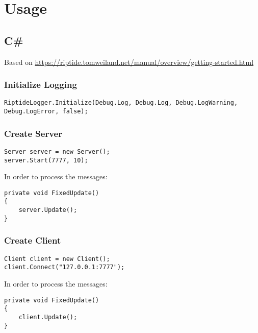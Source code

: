 \renewcommand{\namespace}{\nsHighLevel}

\chapter{Usage}

\section{C\#}

Based on \url{https://riptide.tomweiland.net/manual/overview/getting-started.html}

\subsection{Initialize Logging}

\begin{lstlisting}[style=CSharp]
RiptideLogger.Initialize(Debug.Log, Debug.Log, Debug.LogWarning, Debug.LogError, false);
\end{lstlisting}

\subsection{Create Server}

\begin{lstlisting}[style=CSharp]
Server server = new Server();
server.Start(7777, 10);
\end{lstlisting}

In order to process the messages:

\begin{lstlisting}[style=CSharp]
private void FixedUpdate()
{
	server.Update();
}
\end{lstlisting}

\subsection{Create Client}

\begin{lstlisting}[style=CSharp]
Client client = new Client();
client.Connect("127.0.0.1:7777");
\end{lstlisting}

In order to process the messages:

\begin{lstlisting}[style=CSharp]
private void FixedUpdate()
{
	client.Update();
}
\end{lstlisting}


